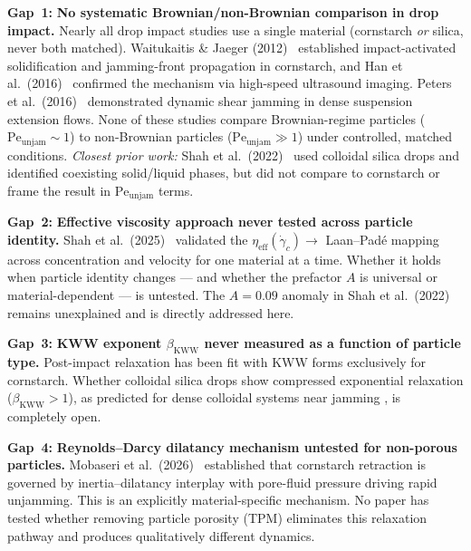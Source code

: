 \documentclass[11pt,letterpaper]{article}
\newcommand{\peunj}{\mathrm{Pe}_{\mathrm{unjam}}}
\newcommand{\etaeff}{\eta_{\mathrm{eff}}}
\newcommand{\gamcrit}{\dot{\gamma}_c}
\newcommand{\bkww}{\beta_{\mathrm{KWW}}}
\newcommand{\gap}[1]{\textbf{\color{gapborder}Gap~#1:}}
\begin{document}
\begin{gapbox}
\gap{1} \textbf{No systematic Brownian/non-Brownian comparison in drop impact.}
Nearly all drop impact studies use a single material (cornstarch \emph{or}
silica, never both matched). Waitukaitis \& Jaeger (2012)~\cite{Waitukaitis2012}
established impact-activated solidification and jamming-front propagation in
cornstarch, and Han et al.\ (2016)~\cite{HanJaeger2016} confirmed the mechanism
via high-speed ultrasound imaging. Peters et al.\ (2016)~\cite{Peters2016}
demonstrated dynamic shear jamming in dense suspension extension flows. None
of these studies compare Brownian-regime particles ($\peunj \sim 1$) to
non-Brownian particles ($\peunj \gg 1$) under controlled, matched conditions.
\emph{Closest prior work:} Shah et al.\ (2022)~\cite{Shah2022} used colloidal
silica drops and identified coexisting solid/liquid phases, but did not compare
to cornstarch or frame the result in $\peunj$ terms.
\end{gapbox}

\begin{gapbox}
\gap{2} \textbf{Effective viscosity approach never tested across particle identity.}
Shah et al.\ (2025)~\cite{Mobaseri2025} validated the $\etaeff(\gamcrit)
\to$ Laan--Padé mapping across concentration and velocity for one material at
a time. Whether it holds when particle identity changes --- and whether the
prefactor $A$ is universal or material-dependent --- is untested. The $A = 0.09$
anomaly in Shah et al.\ (2022)~\cite{Shah2022} remains unexplained and is
directly addressed here.
\end{gapbox}

\begin{gapbox}
\gap{3} \textbf{KWW exponent $\bkww$ never measured as a function of particle type.}
Post-impact relaxation has been fit with KWW forms exclusively for cornstarch.
Whether colloidal silica drops show compressed exponential relaxation
($\bkww > 1$), as predicted for dense colloidal systems near jamming
\cite{Ballesta2008}, is completely open.
\end{gapbox}

\begin{gapbox}
\gap{4} \textbf{Reynolds--Darcy dilatancy mechanism untested for non-porous particles.}
Mobaseri et al.\ (2026)~\cite{Mobaseri2026} established that cornstarch
retraction is governed by inertia--dilatancy interplay with pore-fluid
pressure driving rapid unjamming. This is an explicitly material-specific
mechanism. No paper has tested whether removing particle porosity (TPM)
eliminates this relaxation pathway and produces qualitatively different dynamics.
\end{gapbox}
\end{document}
